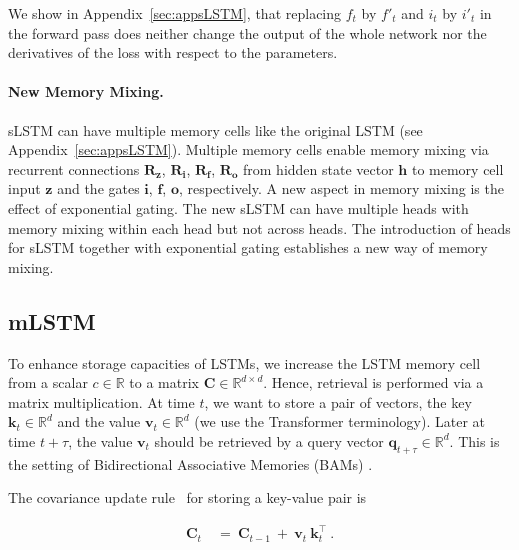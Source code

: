 We show in Appendix~\ref{sec:appsLSTM}, that replacing $f_t$ by $f'_t$ and $i_t$ by $i'_t$ in the forward pass does neither change the output of the whole network nor the derivatives of the loss with respect to the parameters. 

\paragraph{New Memory Mixing.} sLSTM can have multiple memory cells like the original LSTM (see Appendix~\ref{sec:appsLSTM}).
Multiple memory cells enable memory mixing via recurrent connections $\mathbf{R}_{\mathbf{z}}$, $\mathbf{R}_{\mathbf{i}}$, $\mathbf{R}_{\mathbf{f}}$, $\mathbf{R}_{\mathbf{o}}$ 
from hidden state vector $\mathbf{h}$ to memory cell input $\mathbf{z}$ and the gates
$\mathbf{i}$, $\mathbf{f}$, $\mathbf{o}$, respectively. A new aspect in memory mixing is the effect of exponential gating. The new sLSTM can have multiple heads with memory mixing within each head but not across heads. The introduction of heads for sLSTM together with exponential gating establishes a new way of memory mixing.

\subsection{mLSTM}
\label{sec:mLSTM}

To enhance storage capacities of LSTMs, we increase the LSTM memory cell from a scalar $c \in \mathbb{R}$
to a matrix $\mathbf{C} \in \mathbb{R}^{d \times d}$. Hence, retrieval is performed via a matrix multiplication. At time $t$, we want to store a pair of vectors, the key $\mathbf{k}_t \in \mathbb{R}^d$ and the value $\mathbf{v}_t \in \mathbb{R}^d$
(we use the Transformer terminology). Later at time $t + \tau$, the value $\mathbf{v}_t$ should be retrieved by a query vector $\mathbf{q}_{t+\tau} \in \mathbb{R}^d$.
This is the setting of Bidirectional Associative Memories (BAMs) \citep{Kohonen:72,Anderson:72,Nakano:72,Anderson:77}.

The covariance update rule~\citep{Sejnowski:77,Dayan:91} for storing a key-value pair is

\begin{align}
\mathbf{C}_t \ &= \ \mathbf{C}_{t-1} \ + \ \mathbf{v}_{t} \ \mathbf{k}_t^\top \ .
\end{align}

